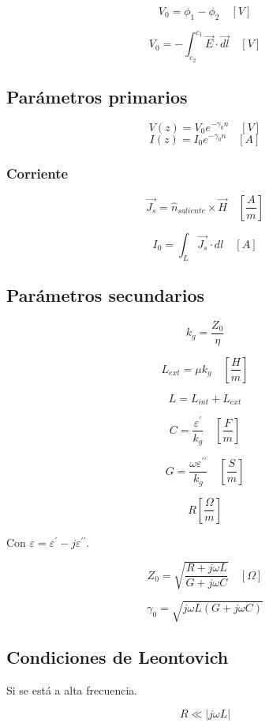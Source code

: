\documentclass[12pt,a4paper]{article}
\begin{document}
\[ V_0 = \phi_1 - \phi_2 \quad [V] \]

\[V_0 = - \int_{c_{2}}^{c_{1}} \vec{E} \cdot \vec{dl} \quad [V] \]

\subsection{Parámetros primarios}
\label{sub:parametros_primarios}

\[ V(z) = V_0 e^{- \gamma_0 n} \quad [V] \]
\[ I(z) = I_0 e^{- \gamma_0 n} \quad [A] \]

\subsubsection{Corriente}
\label{ssub:corriente}

\[ \vec{J_s} = \hat{n}_{saliente} \times \vec{H} \quad \left[\frac{A}{m}\right] \]

\[ I_0 = \int_L \vec{J_s} \cdot dl \quad [A] \]

\subsection{Parámetros secundarios}
\label{sub:parametros_secundarios}

\[ k_g = \frac{Z_0}{\eta} \]

\[ L_{ext} = \mu k_g \quad \left[ \frac{H}{m} \right] \]

\[ L = L_{int} + L_{ext} \]

\[ C = \frac{\varepsilon^{\prime}}{k_g} \quad \left[ \frac{F}{m} \right] \]

\[ G = \frac{\omega \varepsilon^{\prime\prime}}{k_g} \quad \left[ \frac{S}{m} \right] \]

\[ R \left[ \frac{\Omega}{m} \right] \]

Con $ \varepsilon = \varepsilon^{\prime} -j\varepsilon^{\prime\prime} $.

\[ Z_0 = \sqrt{\frac{R + j \omega L}{G + j \omega C}} \quad [\Omega] \]

\[ \gamma_0 =  \sqrt{j \omega L (G + j \omega C )} \]

\subsection{Condiciones de Leontovich}
\label{sub:condiciones_de_leontovich}

Si se está a alta frecuencia.

\[ R \ll |j \omega  L| \]
\end{document}
